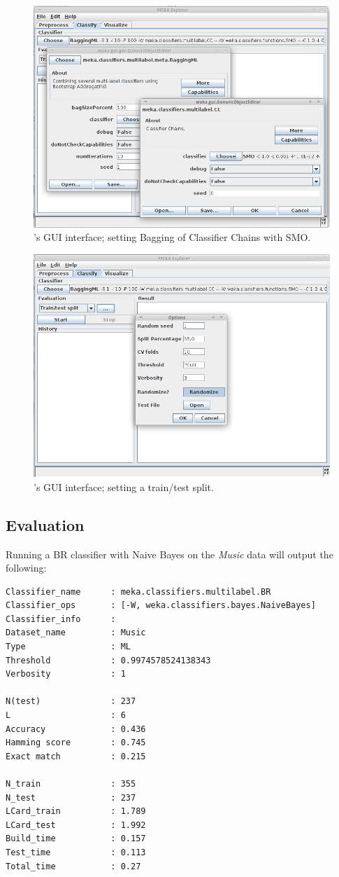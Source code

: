 \documentclass[11pt]{article}
\begin{document}
\begin{figure}
	\centering
	\includegraphics[height=0.60\textwidth]{GUI02.png}
	\caption{\label{screen:eval} 's GUI interface; setting Bagging of Classifier Chains with SMO.}
\end{figure}


\begin{figure}
	\centering
	\includegraphics[height=0.60\textwidth]{GUI03.png}
	\caption{\label{screen:split} 's GUI interface; setting a train/test split.}
\end{figure}

\subsection{\label{sec:evaluation}Evaluation}

Running a BR classifier with Naive Bayes on the \textit{Music} data will output the following:

{\small
\begin{lstlisting}
Classifier_name      : meka.classifiers.multilabel.BR
Classifier_ops       : [-W, weka.classifiers.bayes.NaiveBayes]
Classifier_info      : 
Dataset_name         : Music
Type                 : ML
Threshold            : 0.9974578524138343
Verbosity            : 1

N(test)              : 237
L                    : 6    
Accuracy             : 0.436
Hamming score        : 0.745
Exact match          : 0.215

N_train              : 355
N_test               : 237
LCard_train          : 1.789
LCard_test           : 1.992
Build_time           : 0.157
Test_time            : 0.113
Total_time           : 0.27 
\end{lstlisting}
}
\end{document}
